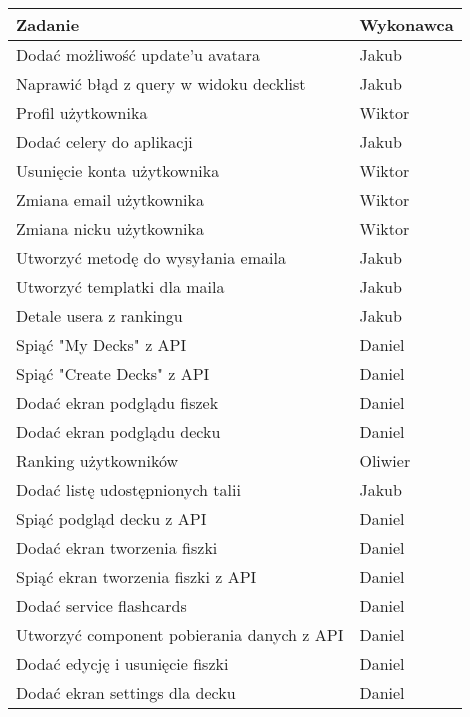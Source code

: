 \begin{table}[H]
\centering
\begin{tabularx}{\textwidth}{|p{}|X|}
    \hline
    \textbf{Zadanie} & \textbf{Wykonawca} \\
    \hline
    [MOBILE] Dodać możliwość update'u avatara & Jakub \\
    \hline
    [MOBILE] Naprawić błąd z query w widoku decklist & Jakub \\
    \hline
    [WEB] Profil użytkownika & Wiktor \\
    \hline
    [BACKEND] Dodać celery do aplikacji & Jakub \\
    \hline
    [WEB] Usunięcie konta użytkownika & Wiktor \\
    \hline
    [WEB] Zmiana email użytkownika & Wiktor \\
    \hline
    [WEB] Zmiana nicku użytkownika & Wiktor \\
    \hline
    [BACKEND] Utworzyć metodę do wysyłania emaila & Jakub \\
    \hline
    [BACKEND] Utworzyć templatki dla maila & Jakub \\
    \hline
    [MOBILE] Detale usera z rankingu & Jakub \\
    \hline
    [MOBILE] Spiąć "My Decks" z API & Daniel \\
    \hline
    [MOBILE] Spiąć "Create Decks" z API & Daniel \\
    \hline
    [MOBILE] Dodać ekran podglądu fiszek & Daniel \\
    \hline
    [MOBILE] Dodać ekran podglądu decku & Daniel \\
    \hline
    [WEB] Ranking użytkowników & Oliwier \\
    \hline
    [MOBILE] Dodać listę udostępnionych talii & Jakub \\
    \hline
    [MOBILE] Spiąć podgląd decku z API & Daniel \\
    \hline
    [MOBILE] Dodać ekran tworzenia fiszki & Daniel \\
    \hline
    [MOBILE] Spiąć ekran tworzenia fiszki z API & Daniel \\
    \hline
    [MOBILE] Dodać service flashcards & Daniel \\
    \hline
    [MOBILE] Utworzyć component pobierania danych z API & Daniel \\
    \hline
    [MOBILE] Dodać edycję i usunięcie fiszki & Daniel \\
    \hline
    [MOBILE] Dodać ekran settings dla decku & Daniel \\

\end{tabularx}
\end{table}
